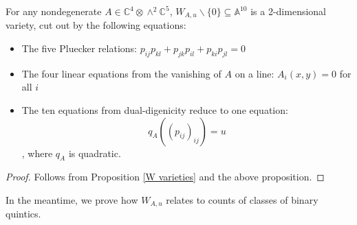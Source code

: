 \documentclass{report}
\begin{document}
\begin{corollary} \label{W equations}
For any nondegenerate $A \in \mathbb{C}^4 \otimes \wedge^2 \mathbb{C}^5$, $W_{A,u} \backslash \{0\} \subseteq \mathbb{A}^{10}$ is a 2-dimensional variety, cut out by the following equations:
\begin{itemize}
\item The five Pluecker relations: $p_{ij} p_{kl} + p_{jk} p_{il} + p_{ki} p_{jl} = 0$
\item The four linear equations from the vanishing of $A$ on a line: $A_i(x,y) = 0$ for all $i$
\item The ten equations from dual-digenicity reduce to one equation:
\begin{equation} q_A((p_{ij})_{ij}) = u \end{equation}, where $q_A$ is quadratic.
\end{itemize}
\end{corollary}
\begin{proof}
Follows from Proposition \ref{W varieties} and the above proposition.
\end{proof}

In the meantime, we prove how $W_{A,u}$ relates to counts of classes of binary quintics.
\end{document}
